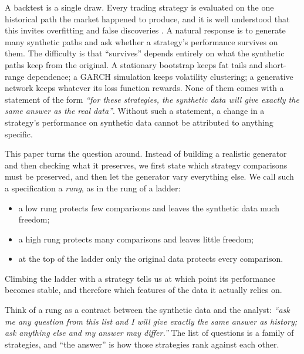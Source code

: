 \documentclass[11pt]{article}
\theoremstyle{definition}
\theoremstyle{remark}
\begin{document}
A backtest is a single draw. Every trading strategy is evaluated on the one historical path the market happened to
produce, and it is well understood that this invites overfitting and false discoveries
\citep{bailey2014,harvey2016,lopezdeprado2018}. A natural response is to generate many synthetic paths and ask
whether a strategy's performance survives on them. The difficulty is that ``survives'' depends entirely on what the
synthetic paths keep from the original. A stationary bootstrap keeps fat tails and short-range dependence; a GARCH
simulation keeps volatility clustering; a generative network keeps whatever its loss function rewards. None of them
comes with a statement of the form \emph{``for these strategies, the synthetic data will give exactly the same answer
as the real data''}. Without such a statement, a change in a strategy's performance on synthetic data cannot be
attributed to anything specific.

This paper turns the question around. Instead of building a realistic generator and then checking what it preserves,
we first state which strategy comparisons must be preserved, and then let the generator vary everything else.
We call such a specification a \emph{rung}, as in the rung of a ladder:
\begin{itemize}[leftmargin=*,itemsep=2pt]
  \item a low rung protects few comparisons and leaves the synthetic data much freedom;
  \item a high rung protects many comparisons and leaves little freedom;
  \item at the top of the ladder only the original data protects every comparison.
\end{itemize}
Climbing the ladder with a strategy tells us at which point its performance becomes stable, and therefore which
features of the data it actually relies on.

\begin{plainwords}
Think of a rung as a contract between the synthetic data and the analyst: \emph{``ask me any question from this list
and I will give exactly the same answer as history; ask anything else and my answer may differ.''} The list of questions
is a family of strategies, and ``the answer'' is how those strategies rank against each other.
\end{plainwords}
\end{document}
